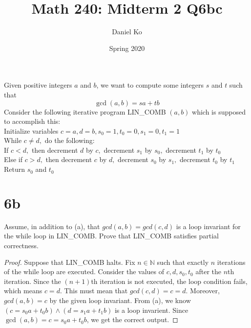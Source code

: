 \documentclass[11pt]{scrartcl}
\title{Math 240: Midterm 2 Q6bc}
\author{Daniel Ko}
\date{Spring 2020}
\begin{document}
\maketitle

Given positive integers $a$ and $b$, we want to compute some integers $s$ and $t$ such that
\[\operatorname{gcd}(a, b)=s a+t b\]
Consider the following iterative program LIN\_COMB $(a, b)$ which is supposed to accomplish this:\\
\hspace*{10mm}Initialize variables $c=a, d=b, s_{0}=1, t_{0}=0, s_{1}=0, t_{1}=1$\\
\hspace*{10mm}While $c \neq d,$ do the following:\\
\hspace*{20mm}If $c<d,$ then decrement $d$ by $c,$ decrement $s_{1}$ by $s_{0},$ decrement $t_{1}$ by $t_{0}$\\
\hspace*{20mm}Else if $c>d,$ then decrement $c$ by $d,$ decrement $s_{0}$ by $s_{1},$ decrement $t_{0}$ by $t_{1}$\\
\hspace*{10mm}Return $s_{0}$ and $t_{0}$\\

\section{6b}
Assume, in addition to (a), that $gcd(a, b) = gcd(c, d)$ is a loop invariant for
the while loop in LIN\_COMB. Prove that LIN\_COMB satisfies partial correctness.
\begin{proof}
	Suppose that LIN\_COMB halts. 
	Fix $n \in \mathbb{N}$ such that exactly $n$ iterations of the while loop are executed.
	Consider the values of $c, d, s_{0}, t_{0}$ after the $n$th iteration.  
	Since the $(n + 1)$th iteration is not executed, the loop condition fails, which means $c = d$. 
	This must mean that $gcd(c, d) = c = d$. Moreover, $gcd(a, b) = c$ by the given loop invariant.
	From (a), we know $(c=s_{0} a+t_{0} b) \wedge (d=s_{1} a+t_{1} b)$ is a loop invarient.
	Since $\operatorname{gcd}(a, b) = c=s_{0} a+t_{0} b$, we get the correct output.
\end{proof}
\end{document}
